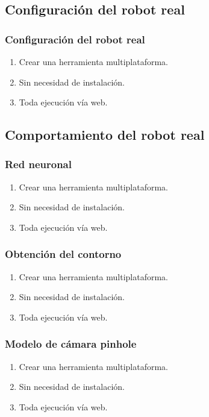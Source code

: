 \documentclass{beamer}
\begin{document}
\subsection{Configuración del robot real}

\begin{frame}
	\frametitle{Configuración del robot real}
	\begin{enumerate}
		\item Crear una herramienta multiplataforma.
		\item Sin necesidad de instalación.
		\item Toda ejecución vía web.
	\end{enumerate}
\end{frame}

\subsection{Comportamiento del robot real}
\begin{frame}
	\frametitle{Red neuronal}
	\begin{enumerate}
		\item Crear una herramienta multiplataforma.
		\item Sin necesidad de instalación.
		\item Toda ejecución vía web.
	\end{enumerate}
\end{frame}

\begin{frame}
	\frametitle{Obtención del contorno}
	\begin{enumerate}
		\item Crear una herramienta multiplataforma.
		\item Sin necesidad de instalación.
		\item Toda ejecución vía web.
	\end{enumerate}
\end{frame}

\begin{frame}
	\frametitle{Modelo de cámara pinhole}
	\begin{enumerate}
		\item Crear una herramienta multiplataforma.
		\item Sin necesidad de instalación.
		\item Toda ejecución vía web.
	\end{enumerate}
\end{frame}
\end{document}
